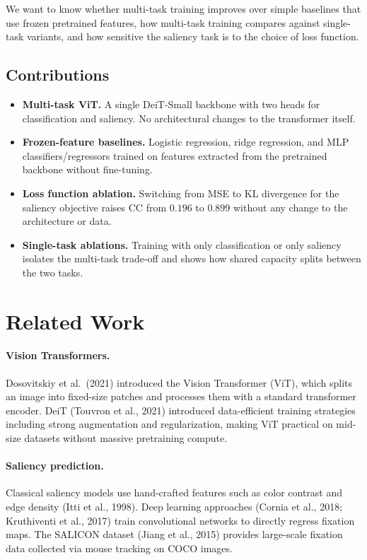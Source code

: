 \documentclass{article}
\begin{document}
We want to know whether multi-task training improves over simple baselines that use frozen pretrained features, how multi-task training compares against single-task variants, and how sensitive the saliency task is to the choice of loss function.

\subsection{Contributions}
\begin{itemize}
  \item \textbf{Multi-task ViT.} A single DeiT-Small backbone with two heads for classification and saliency. No architectural changes to the transformer itself.
  \item \textbf{Frozen-feature baselines.} Logistic regression, ridge regression, and MLP classifiers/regressors trained on features extracted from the pretrained backbone without fine-tuning.
  \item \textbf{Loss function ablation.} Switching from MSE to KL divergence for the saliency objective raises CC from $0.196$ to $0.899$ without any change to the architecture or data.
  \item \textbf{Single-task ablations.} Training with only classification or only saliency isolates the multi-task trade-off and shows how shared capacity splits between the two tasks.
\end{itemize}

\section{Related Work}

\paragraph{Vision Transformers.}
Dosovitskiy et al.\ (2021) introduced the Vision Transformer (ViT), which splits an image into fixed-size patches and processes them with a standard transformer encoder. DeiT (Touvron et al., 2021) introduced data-efficient training strategies including strong augmentation and regularization, making ViT practical on mid-size datasets without massive pretraining compute.

\paragraph{Saliency prediction.}
Classical saliency models use hand-crafted features such as color contrast and edge density (Itti et al., 1998). Deep learning approaches (Cornia et al., 2018; Kruthiventi et al., 2017) train convolutional networks to directly regress fixation maps. The SALICON dataset (Jiang et al., 2015) provides large-scale fixation data collected via mouse tracking on COCO images.
\end{document}
